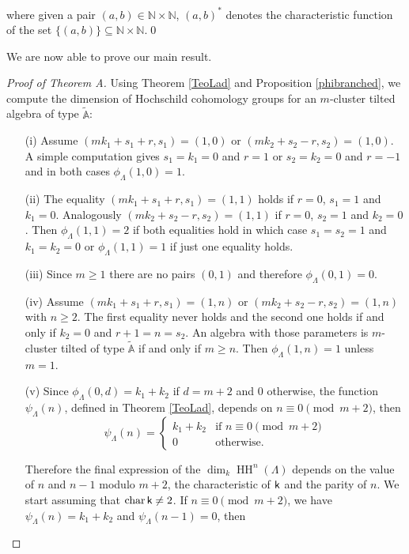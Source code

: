 \documentclass{amsart}
\theoremstyle{plain}
\theoremstyle{definition}
\begin{document}
where given a pair $(a,b)\in \mathbb{N} \times \mathbb{N}$,  $(a,b)^\ast$ denotes the characteristic function of the set  $\{(a,b)\} \subseteq \mathbb{N} \times \mathbb{N}$.\qed

\medskip

We are now able to prove our main result.

\begin{proof}[Proof of Theorem A] Using  Theorem \ref{TeoLad} and Proposition \ref{phibranched}, we compute the dimension of Hochschild cohomology groups for an $m$-cluster tilted algebra of type $\widetilde{\mathbb{A}}$:

\begin{itemize}

\item[(i)] Assume $(mk_1+s_1+r,s_1)=(1,0)$ or $(mk_2+s_2-r,s_2)=(1,0)$. A simple computation gives $s_1=k_1=0$ and $r=1$ or  $s_2=k_2=0$ and $r=-1$ and in both cases $\phi_{\Lambda}(1,0)=1$.

\item[(ii)] The equality $(mk_1+s_1+r,s_1)=(1,1)$ holds if $r=0$,  $ s_1=1$ and   $k_1=0$. Analogously  $(mk_2+s_2-r,s_2)=(1,1)$ if $r=0$,  $s_2=1$ and  $k_2=0$.  Then $\phi_{\Lambda}(1,1)=2$  if both equalities hold in which case $ s_1=s_2=1$ and   $k_1=k_2=0$ or $\phi_{\Lambda}(1,1)=1$ if just one equality holds.

\item[(iii)] Since $m\geq1$ there are no pairs $(0,1)$ and therefore $\phi_{\Lambda}(0,1)=0$.

\item[(iv)]  Assume  $(mk_1+s_1+r,s_1)=(1,n)$ or  $(mk_2+s_2-r,s_2)=(1,n)$ with $n\geq 2$. The first equality never holds and the second one holds if and only if $k_2=0$ and $r+1=n=s_2$. An algebra with those parameters is  $m$-cluster tilted of type $\tilde{\mathbb{A}}$ if and only if $m\geq n$.  Then $\phi_{\Lambda}(1,n)=1$ unless $m=1$.

\item[(v)] Since $\phi_{\Lambda}(0,d)= k_1+k_2$ if $d=m+2$ and $0$ otherwise, the function $\psi_{\Lambda}(n)$, defined in Theorem \ref{TeoLad}, depends on $n\equiv 0\pmod{m+2}$, then $$\psi_{\Lambda}(n)=\begin{cases} k_1+k_2 &
    \mbox{if } n\equiv 0\pmod{m+2}\\ 0 & \mbox{otherwise.} \end{cases}$$

Therefore the final expression of the ${\operatorname{dim}_k\operatorname{HH}^{{n}}(\Lambda)}$ depends on the value of $n$ and $n-1$ modulo $m+2$, the characteristic of ${{\normalfont{\textsf{k}}}}$ and the parity of $n$. We start assuming that $\operatorname{char} {{\normalfont{\textsf{k}}}} \neq 2$. If $n\equiv 0 \pmod{m+2}$, we have $\psi_{\Lambda}(n)= k_1+k_2$ and $\psi_{\Lambda}(n-1)=0$, then


\end{itemize}
\end{proof}
\end{document}
